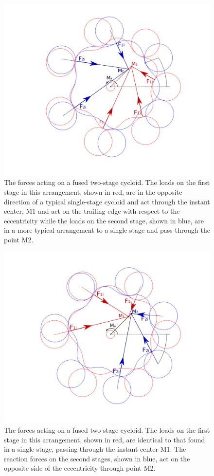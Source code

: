 \begin{figure}[h]
	\centering
	\includegraphics[width=0.80\linewidth]{fig/two_stage_loads_pos}
   \caption{The forces acting on a fused two-stage cycloid. The loads on the first stage in this arrangement, shown in red, are in the opposite direction of a typical single-stage cycloid and act through the instant center, M1 and act on the trailing edge with respect to the eccentricity while the loads on the second stage, shown in blue, are in a more typical arrangement to a single stage and pass through the point M2. }
   \label{fig:two_stage_force_pos}
\end{figure}

\begin{figure}[h]
	\centering
	\includegraphics[width=0.80\linewidth]{fig/two_stage_loads_neg}
   \caption{The forces acting on a fused two-stage cycloid. The loads on the first stage in this arrangement, shown in red, are identical to that found in a single-stage, passing through the instant center M1. The reaction forces on the second stages, shown in blue, act on the opposite side of the eccentricity through point M2. }
   \label{fig:two_stage_force_neg}
\end{figure}


